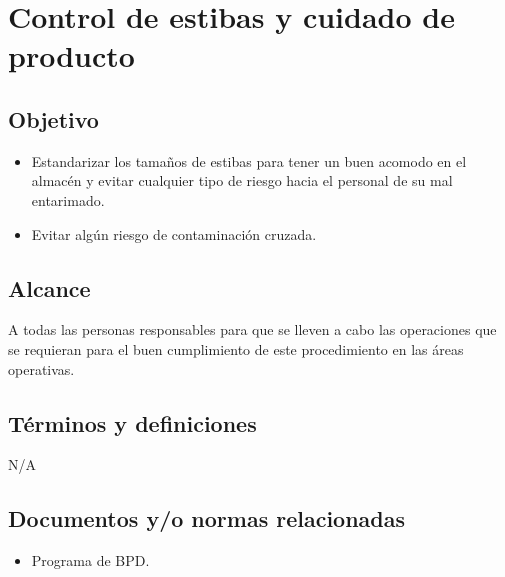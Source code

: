 \thispagestyle{formato-PI}
\renewcommand{\MayorVer}{2}
\renewcommand{\MenorVer}{1}
\renewcommand{\Codigo}{PSA-1-PROG} %
\renewcommand{\FechaPub}{2023--01}
\renewcommand{\Titulo}{Control de estibas y cuidado de producto}

\section{\Titulo}
\label{ESP-ControlDeEstibas}


\subsection{Objetivo}

\begin{itemize}
	\item Estandarizar los tamaños de estibas para tener un buen acomodo en el almacén y evitar cualquier tipo de riesgo hacia el personal de su mal entarimado.
	\item Evitar algún riesgo de contaminación cruzada.
\end{itemize}

\subsection{Alcance}

A todas las personas responsables para que se lleven a cabo las operaciones que se requieran para el buen cumplimiento de este procedimiento en las áreas operativas.

\subsection{Términos y definiciones}

N/A

\subsection{Documentos y/o normas relacionadas}

\begin{itemize}
	\item Programa de \gls{BPD}.
\end{itemize}

